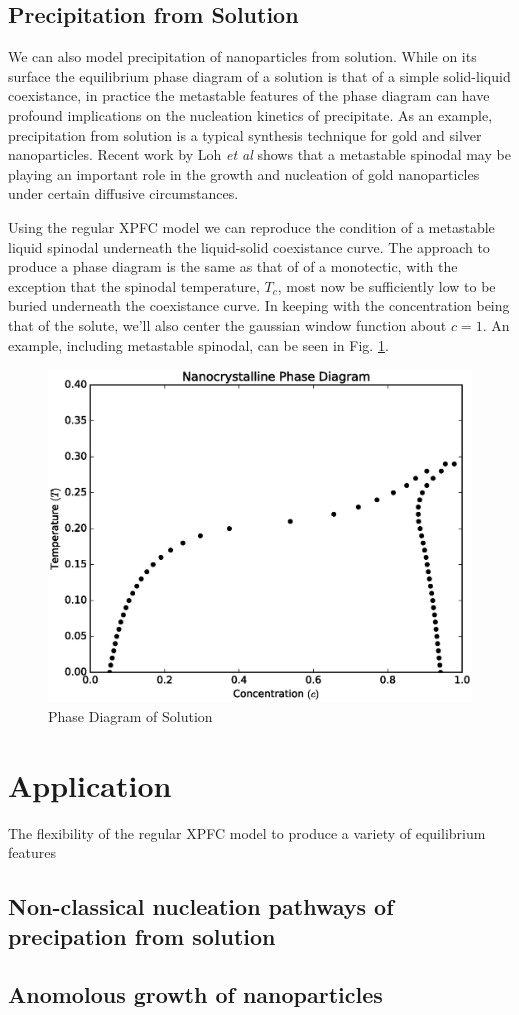 \documentclass[showkeys, prb, reprint]{revtex4-1}
\begin{document}
\subsection{Precipitation from Solution}

We can also model precipitation of nanoparticles from solution. While on its
surface the equilibrium phase diagram of a solution is that of a simple
solid-liquid coexistance, in practice the metastable features of the phase
diagram can have profound implications on the nucleation kinetics of
precipitate. As an example, precipitation from solution is a typical synthesis
technique for gold and silver nanoparticles. Recent work by Loh \textit{et al}
shows that a metastable spinodal may be playing an important role in the growth
and nucleation of gold nanoparticles under certain diffusive circumstances.

Using the regular XPFC model we can reproduce the condition of a metastable
liquid spinodal underneath the liquid-solid coexistance curve. The approach to
produce a phase diagram is the same as that of of a monotectic, with the
exception that the spinodal temperature, $T_c$, most now be sufficiently low to
be buried underneath the coexistance curve. In keeping with the concentration
being that of the solute, we'll also center the gaussian window function about
$c = 1$. An example, including metastable spinodal, can be seen in Fig.
\ref{precip}.

\begin{figure}
	\includegraphics[scale=0.3]{solution.eps}
	\caption{\label{precip} Phase Diagram of Solution}
\end{figure}

\section{Application}

The flexibility of the regular XPFC model to produce a variety of equilibrium
features

\subsection{Non-classical nucleation pathways of precipation from solution}

\subsection{Anomolous growth of nanoparticles}


\end{document}

